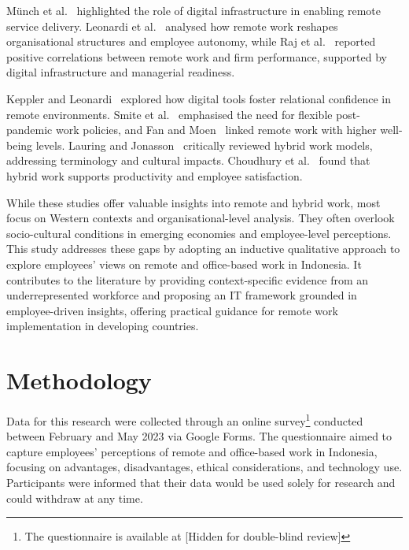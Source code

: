 \documentclass[conference]{IEEEtran}
\begin{document}
Münch et al.~\cite{munch2022capabilities} highlighted the role of digital infrastructure in enabling remote service delivery. Leonardi et al.~\cite{Leonardi2024RemoteWork} analysed how remote work reshapes organisational structures and employee autonomy, while Raj et al.~\cite{Raj2023Remote} reported positive correlations between remote work and firm performance, supported by digital infrastructure and managerial readiness.

Keppler and Leonardi~\cite{Keppler2023RelationalConfidence} explored how digital tools foster relational confidence in remote environments. Smite et al.~\cite{Smite2023WFHFlexibility} emphasised the need for flexible post-pandemic work policies, and Fan and Moen~\cite{Fan2023SubjectiveWellbeing} linked remote work with higher well-being levels. Lauring and Jonasson~\cite{Lauring2024Hybrid} critically reviewed hybrid work models, addressing terminology and cultural impacts. Choudhury et al.~\cite{Choudhury2024Hybrid} found that hybrid work supports productivity and employee satisfaction.

While these studies offer valuable insights into remote and hybrid work, most focus on Western contexts and organisational-level analysis. They often overlook socio-cultural conditions in emerging economies and employee-level perceptions. This study addresses these gaps by adopting an inductive qualitative approach to explore employees’ views on remote and office-based work in Indonesia. It contributes to the literature by providing context-specific evidence from an underrepresented workforce and proposing an IT framework grounded in employee-driven insights, offering practical guidance for remote work implementation in developing countries.



\section{Methodology}
\label{sec:methodology}

Data for this research were collected through an online survey\footnote{The questionnaire is available at 
	[Hidden for double-blind review]
} conducted between February and May 2023 via Google Forms. The questionnaire aimed to capture employees' perceptions of remote and office-based work in Indonesia, focusing on advantages, disadvantages, ethical considerations, and technology use. Participants were informed that their data would be used solely for research and could withdraw at any time.
\end{document}
